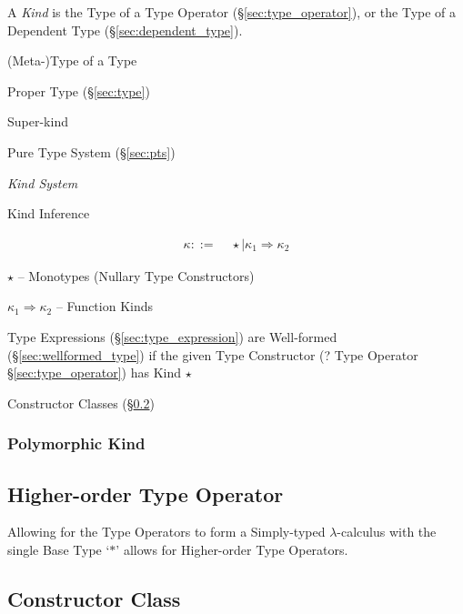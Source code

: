 A \emph{Kind} is the Type of a Type Operator
(\S\ref{sec:type_operator}), or the Type of a Dependent Type
(\S\ref{sec:dependent_type}).

(Meta-)Type of a Type

\fist Proper Type (\S\ref{sec:type})

Super-kind

Pure Type System (\S\ref{sec:pts})


\cite{jones95}


\emph{Kind System}

Kind Inference

\begin{align*}
  \kappa ::= &\; \star \mid \kappa_1 \Rightarrow \kappa_2
\end{align*}

$\star$ -- Monotypes (Nullary Type Constructors)

$\kappa_1 \Rightarrow \kappa_2$ -- Function Kinds

Type Expressions (\S\ref{sec:type_expression}) are Well-formed
(\S\ref{sec:wellformed_type}) if the given Type Constructor (? Type
Operator \S\ref{sec:type_operator}) has Kind $\star$

Constructor Classes (\S\ref{sec:constructor_class})



\subsubsection{Polymorphic Kind}\label{sec:polymorphic_kind}



\subsection{Higher-order Type Operator}
\label{sec:higherorder_typeoperator}

Allowing for the Type Operators to form a Simply-typed
$\lambda$-calculus with the single Base Type `$*$' allows for
Higher-order Type Operators.



\subsection{Constructor Class}\label{sec:constructor_class}

